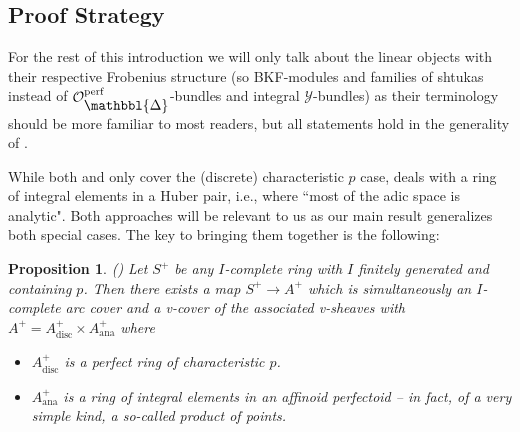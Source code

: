 \documentclass[10pt,twoside]{article}
\numberwithin{equation}{section}
\theoremstyle{plain}
\newtheorem{myprop}[mythm]{Proposition}
\theoremstyle{definition}
\DeclareMathOperator{\ana}{ana}
\DeclareMathOperator{\disc}{disc}
\newcommand{\MCO}{\mathcal{O}}
\newcommand{\MCY}{\mathcal{Y}}
\DeclareMathOperator{\perf}{perf}
\newcommand{\Prism}{{\mathlarger{\mathbbl{\Delta}}}}
\newcommand{\OpP}{\MCO^{\perf}_{\Prism}}
\begin{document}
\subsection*{Proof Strategy}
For the rest of this introduction we will only talk about the linear objects with their respective Frobenius structure (so BKF-modules and families of shtukas instead of \(\OpP\)-bundles and integral \(\MCY\)-bundles) as their terminology should be more familiar to most readers, but all statements hold in the generality of .\par
While both \cite{Ans22} and \cite[Theorem 2.3.8]{PR} only cover the (discrete) characteristic \(p\) case, \cite[Proposition 2.3.11]{PR} deals with a ring of integral elements in a Huber pair, i.e., where ``most of the adic space is analytic". Both approaches will be relevant to us as our main result generalizes both special cases. The key to bringing them together is the following:


\begin{myprop}\emph{()}
Let \(S^+\) be any \(I\)-complete ring with \(I\) finitely generated and containing \(p\). Then there exists a map \(S^+\to A^+\) which is simultaneously an \(I\)-complete arc cover and a v-cover of the associated v-sheaves with \(A^+=A^+_{\disc}\times A^+_{\ana}\) where
\begin{itemize}
    \item \(A^+_{\disc}\) is a perfect ring of characteristic \(p\).
    \item \(A^+_{\ana}\) is a ring of integral elements in an affinoid perfectoid -- in fact, of a very simple kind, a so-called \emph{product of points}.
\end{itemize} 

\end{myprop}
\end{document}

